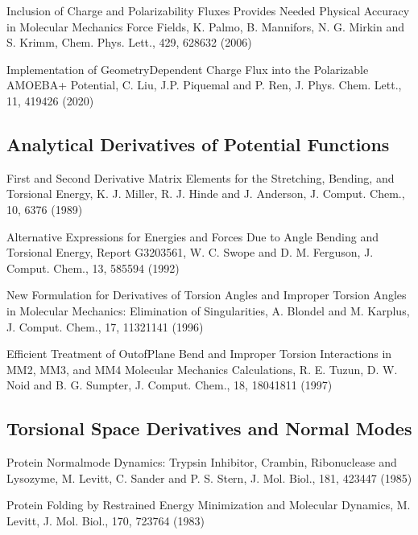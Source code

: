 \documentclass[letterpaper,11pt,english]{sphinxmanual}
\begin{document}
\sphinxAtStartPar
Inclusion of Charge and Polarizability Fluxes Provides Needed Physical Accuracy in Molecular Mechanics Force Fields, K. Palmo, B. Mannifors, N. G. Mirkin and S. Krimm, Chem. Phys. Lett., 429, 628\sphinxhyphen{}632 (2006)

\sphinxAtStartPar
Implementation of Geometry\sphinxhyphen{}Dependent Charge Flux into the Polarizable AMOEBA+ Potential, C. Liu, J.\sphinxhyphen{}P. Piquemal and P. Ren, J. Phys. Chem. Lett., 11, 419\sphinxhyphen{}426 (2020)


\subsection{Analytical Derivatives of Potential Functions}
\label{\detokenize{text/references:analytical-derivatives-of-potential-functions}}
\sphinxAtStartPar
First and Second Derivative Matrix Elements for the Stretching, Bending, and Torsional Energy, K. J. Miller, R. J. Hinde and J. Anderson, J. Comput. Chem., 10, 63\sphinxhyphen{}76 (1989)

\sphinxAtStartPar
Alternative Expressions for Energies and Forces Due to Angle Bending and Torsional Energy, Report G320\sphinxhyphen{}3561, W. C. Swope and D. M. Ferguson, J. Comput. Chem., 13, 585\sphinxhyphen{}594 (1992)

\sphinxAtStartPar
New Formulation for Derivatives of Torsion Angles and Improper Torsion Angles in Molecular Mechanics: Elimination of Singularities, A. Blondel and M. Karplus, J. Comput. Chem., 17, 1132\sphinxhyphen{}1141 (1996)

\sphinxAtStartPar
Efficient Treatment of Out\sphinxhyphen{}of\sphinxhyphen{}Plane Bend and Improper Torsion Interactions in MM2, MM3, and MM4 Molecular Mechanics Calculations, R. E. Tuzun, D. W. Noid and B. G. Sumpter, J. Comput. Chem., 18, 1804\sphinxhyphen{}1811 (1997)


\subsection{Torsional Space Derivatives and Normal Modes}
\label{\detokenize{text/references:torsional-space-derivatives-and-normal-modes}}
\sphinxAtStartPar
Protein Normal\sphinxhyphen{}mode Dynamics:  Trypsin Inhibitor, Crambin, Ribonuclease and Lysozyme, M. Levitt, C. Sander and P. S. Stern, J. Mol. Biol., 181, 423\sphinxhyphen{}447 (1985)

\sphinxAtStartPar
Protein Folding by Restrained Energy Minimization and Molecular Dynamics, M. Levitt, J. Mol. Biol., 170, 723\sphinxhyphen{}764 (1983)
\end{document}
